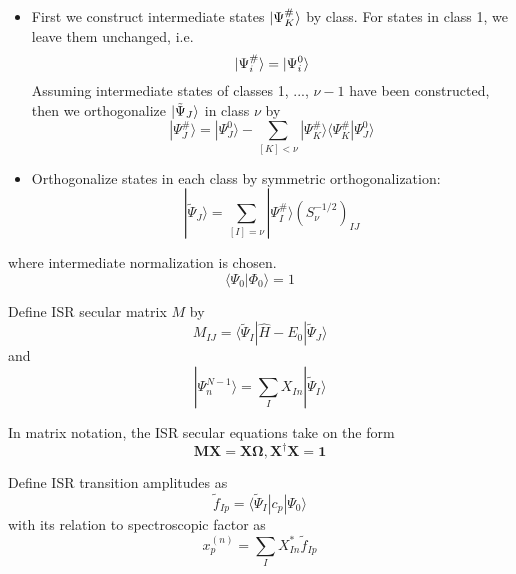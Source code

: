 \begin{itemize}
	\item First we construct intermediate states $\ket{\Psi^{\#}_K}$ by class. For states in class 1, we leave them unchanged, i.e.
		\begin{equation}
			\ket{\Psi^{\#}_i}=\ket{\Psi^0_i}
		\end{equation}
		Assuming intermediate states of classes 1, ..., $\nu-1$ have been constructed, then we orthogonalize $\ket{\tilde{\Psi}_J}$ in class $\nu$ by
		\begin{equation}
			| \Psi_{J}^{\#} \rangle=| \Psi_{J}^{0} \rangle-\sum_{[K]<\nu} | \Psi^{\#}_{K} \rangle\langle\Psi^{\#}_{K} | \Psi_{J}^{0}\rangle
		\end{equation}
	\item Orthogonalize states in each class by symmetric orthogonalization:
		\begin{equation}
			| \tilde{\Psi}_{J} \rangle=\sum_{[I]=\nu} | \Psi_{I}^{\#} \rangle\left(S_{\nu}^{-1 / 2}\right)_{I J}
		\end{equation}
\end{itemize}
where intermediate normalization is chosen.
\begin{equation}
	\langle\Psi_{0} | \Phi_{0}\rangle= 1
\end{equation}

Define ISR secular matrix $M$ by
\begin{equation}
	M_{I J}=\langle\tilde{\Psi}_{I}|\hat{H}-E_{0}| \tilde{\Psi}_{J}\rangle
\end{equation}
and 
\begin{equation}
	| \Psi_{n}^{N-1} \rangle=\sum_{I} X_{I n} | \tilde{\Psi}_{I} \rangle
\end{equation}

In matrix notation, the ISR secular equations take on the form
\begin{equation}
	\boldsymbol{M X}=\boldsymbol{X} \boldsymbol{\Omega}, \boldsymbol{X}^{\dagger} \boldsymbol{X}=\mathbf{1}
\end{equation}

Define ISR transition amplitudes as
\begin{equation}
	\tilde{f}_{I p}=\langle\tilde{\Psi}_{I}|c_{p}| \Psi_{0}\rangle
\end{equation}
with its relation to spectroscopic factor as
\begin{equation}
	x_{p}^{(n)}=\sum_{I} X_{I n}^{*} \tilde{f}_{I p}
\end{equation}

